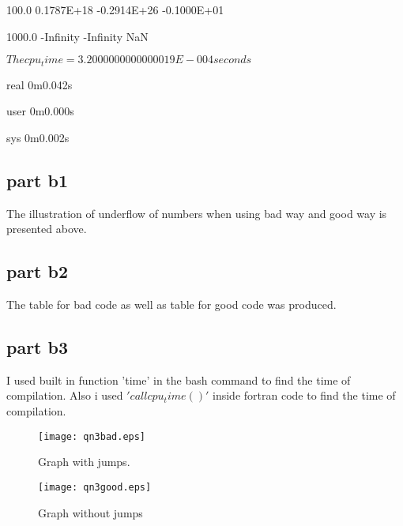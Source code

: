\documentclass{article}
\begin{document}
    100.0    0.1787E+18   -0.2914E+26   -0.1000E+01
    
   1000.0     -Infinity     -Infinity           NaN
    

    $The cpu_time =    3.2000000000000019E-004 seconds$

real	0m0.042s

user	0m0.000s

sys	0m0.002s


\subsection{part b1}
The illustration of underflow of numbers when using bad way and good way is
presented above.

\subsection{part b2}
The table for bad code as well as table for good code was produced.

\subsection{part b3}
I used built in function 'time' in the bash command to find the 
time of compilation. Also i used $'call cpu_time()'$ inside fortran code 
to find the time of compilation.

\begin{figure}[ht!]
  \caption{Graph with jumps.}
  \centering
    \texttt{[image: qn3bad.eps]}
\end{figure}

\begin{figure}[ht!]
  \caption{Graph without jumps}
  \centering
    \texttt{[image: qn3good.eps]}
\end{figure}
\end{document}
